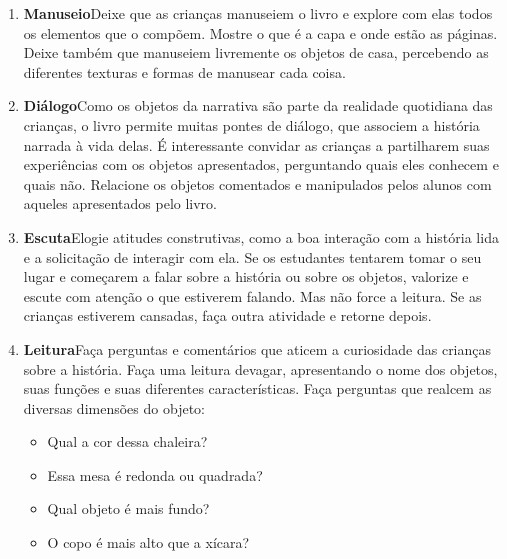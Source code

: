 \documentclass[11pt]{extarticle}
\begin{document}
\begin{enumerate}
\item \textbf{Manuseio}\quad Deixe que as crianças manuseiem o livro 
e explore com elas todos os elementos que o compõem. Mostre o que é a 
capa e onde estão as páginas. Deixe também que manuseiem livremente os objetos de casa, percebendo as diferentes texturas e formas de manusear cada coisa.

\item \textbf{Diálogo}\quad Como os objetos da narrativa são parte da realidade quotidiana das crianças, o livro permite muitas pontes de diálogo, que associem a história narrada à vida delas.
É interessante convidar as crianças a partilharem suas experiências com os objetos apresentados, perguntando quais eles conhecem e quais não. Relacione os objetos comentados e manipulados pelos alunos com aqueles apresentados pelo livro.

\item \textbf{Escuta}\quad Elogie atitudes construtivas, como 
a boa interação com a história lida e a solicitação de interagir com ela. Se os estudantes tentarem 
tomar o seu lugar e começarem a falar sobre a história ou sobre os objetos, valorize e escute com atenção o que estiverem falando. Mas não 
force a leitura. Se as crianças estiverem cansadas, faça outra atividade 
e retorne depois. 

\item \textbf{Leitura}\quad Faça perguntas e comentários que
aticem a curiosidade das crianças sobre a história. Faça 
uma leitura devagar, apresentando o nome dos objetos, suas funções e suas diferentes características.
Faça perguntas que realcem as diversas dimensões do objeto:

\begin{itemize}
\item Qual a cor dessa chaleira?
\item Essa mesa é redonda ou quadrada?
\item Qual objeto é mais fundo?
\item O copo é mais alto que a xícara?
\end{itemize}


\end{enumerate}
\end{document}
